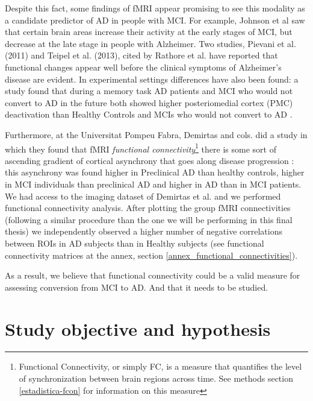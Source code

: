 \documentclass[a4paper,12pt]{elsarticle}  %
\begin{document}
	Despite this fact, some findings of fMRI appear promising to see this modality as a candidate predictor of AD in people with MCI. For example, Johnson et al\cite{Johnson2012} saw that certain brain areas increase their activity at the early stages of MCI, but decrease at the late stage in people with Alzheimer. Two studies, Pievani et al. (2011) and Teipel et al. (2013), cited by Rathore et al. \cite{Rathore2017530} have reported that functional changes appear well before the clinical symptoms of Alzheimer's disease are evident. In experimental settings differences have also been found: a study found that during a memory task AD patients and MCI who would not convert to AD in the future both showed higher posteriomedial cortex (PMC) deactivation than Healthy Controls and MCIs who would not convert to AD \cite{Petrella2007}.
	
	Furthermore, at the Universitat Pompeu Fabra, Demirtas and cols. did a study in which they found that fMRI \textit{functional connectivity}\footnote{Functional Connectivity, or simply FC, is a measure that quantifies the level of synchronization between brain regions across time. See methods section \ref{estadistica-fcon} for information on this measure} there is some sort of ascending gradient of cortical asynchrony that goes along disease progression \cite{Demirtas2017343}: this asynchrony was found higher in Preclinical AD than healthy controls, higher in MCI individuals than preclinical AD and higher in AD than in MCI patients. We had access to the imaging dataset of Demirtas et al.\cite{Demirtas2017343} and we performed functional connectivity analysis. After plotting the group fMRI connectivities (following a similar procedure than the one we will be performing in this final thesis) we independently observed a higher number of negative correlations between ROIs in AD subjects than in Healthy subjects (see functional connectivity matrices at the annex, section \ref{annex_functional_connectivities}).
	
	As a result, we believe that functional connectivity could be a valid measure for assessing conversion from MCI to AD. And that it needs to be studied.



\section{Study objective and hypothesis} \label{study_objectives}
\end{document}
